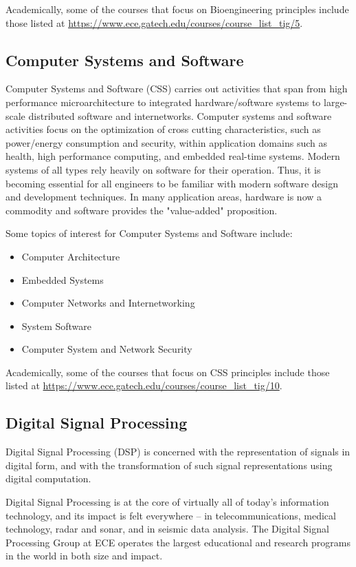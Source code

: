 \documentclass[12pt]{article}
\begin{document}
Academically, some of the courses that focus on Bioengineering principles include those listed at \url{https://www.ece.gatech.edu/courses/course_list_tig/5}.

\subsection{Computer Systems and Software}

Computer Systems and Software (CSS) carries out activities that span from high performance microarchitecture to integrated hardware/software systems to large-scale distributed software and internetworks. Computer systems and software activities focus on the optimization of cross cutting characteristics, such as power/energy consumption and security, within application domains such as health, high performance computing, and embedded real-time systems. Modern systems of all types rely heavily on software for their operation. Thus, it is becoming essential for all engineers to be familiar with modern software design and development techniques. In many application areas, hardware is now a commodity and software provides the "value-added" proposition.

Some topics of interest for Computer Systems and Software include:

\begin{itemize}
    \item Computer Architecture
    \item Embedded Systems
    \item Computer Networks and Internetworking
    \item System Software
    \item Computer System and Network Security
\end{itemize}

Academically, some of the courses that focus on CSS principles include those listed at \url{https://www.ece.gatech.edu/courses/course_list_tig/10}.

\subsection{Digital Signal Processing}

Digital Signal Processing (DSP) is concerned with the representation of signals in digital form, and with the transformation of such signal representations using digital computation.

Digital Signal Processing is at the core of virtually all of today's information technology, and its impact is felt everywhere -- in telecommunications, medical technology, radar and sonar, and in seismic data analysis. The Digital Signal Processing Group at ECE operates the largest educational and research programs in the world in both size and impact.
\end{document}
